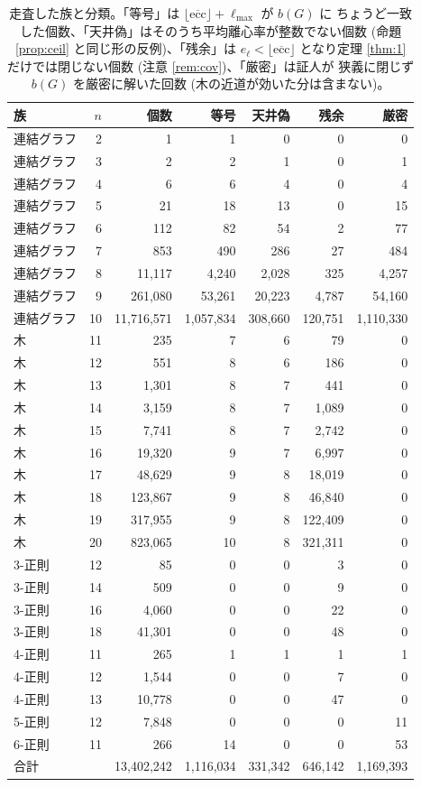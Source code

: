 \documentclass[paper=a4,fontsize=10.5pt,jafontsize=10.5pt]{jlreq}
\theoremstyle{plain}
\theoremstyle{definition}
\begin{document}
\begin{table}[htbp]
\centering
\small
\caption{走査した族と分類。「等号」は
$\lfloor \overline{\mathrm{ecc}} \rfloor + \ell_{\max}$ が $b(G)$ に
ちょうど一致した個数、「天井偽」はそのうち平均離心率が整数でない個数
(命題 \ref{prop:ceil} と同じ形の反例)、「残余」は
$e_{\ell} < \lfloor \overline{\mathrm{ecc}} \rfloor$ となり定理
\ref{thm:1} だけでは閉じない個数 (注意 \ref{rem:cov})、「厳密」は証人が
狭義に閉じず $b(G)$ を厳密に解いた回数 (木の近道が効いた分は含まない)。}
\label{tab:fams}
\begin{tabular}{lrrrrrr}
\toprule
族 & $n$ & 個数 & 等号 & 天井偽 & 残余 & 厳密 \\
\midrule
連結グラフ & 2 & 1 & 1 & 0 & 0 & 0 \\
連結グラフ & 3 & 2 & 2 & 1 & 0 & 1 \\
連結グラフ & 4 & 6 & 6 & 4 & 0 & 4 \\
連結グラフ & 5 & 21 & 18 & 13 & 0 & 15 \\
連結グラフ & 6 & 112 & 82 & 54 & 2 & 77 \\
連結グラフ & 7 & 853 & 490 & 286 & 27 & 484 \\
連結グラフ & 8 & 11,117 & 4,240 & 2,028 & 325 & 4,257 \\
連結グラフ & 9 & 261,080 & 53,261 & 20,223 & 4,787 & 54,160 \\
連結グラフ & 10 & 11,716,571 & 1,057,834 & 308,660 & 120,751 & 1,110,330 \\
木 & 11 & 235 & 7 & 6 & 79 & 0 \\
木 & 12 & 551 & 8 & 6 & 186 & 0 \\
木 & 13 & 1,301 & 8 & 7 & 441 & 0 \\
木 & 14 & 3,159 & 8 & 7 & 1,089 & 0 \\
木 & 15 & 7,741 & 8 & 7 & 2,742 & 0 \\
木 & 16 & 19,320 & 9 & 7 & 6,997 & 0 \\
木 & 17 & 48,629 & 9 & 8 & 18,019 & 0 \\
木 & 18 & 123,867 & 9 & 8 & 46,840 & 0 \\
木 & 19 & 317,955 & 9 & 8 & 122,409 & 0 \\
木 & 20 & 823,065 & 10 & 8 & 321,311 & 0 \\
3-正則 & 12 & 85 & 0 & 0 & 3 & 0 \\
3-正則 & 14 & 509 & 0 & 0 & 9 & 0 \\
3-正則 & 16 & 4,060 & 0 & 0 & 22 & 0 \\
3-正則 & 18 & 41,301 & 0 & 0 & 48 & 0 \\
4-正則 & 11 & 265 & 1 & 1 & 1 & 1 \\
4-正則 & 12 & 1,544 & 0 & 0 & 7 & 0 \\
4-正則 & 13 & 10,778 & 0 & 0 & 47 & 0 \\
5-正則 & 12 & 7,848 & 0 & 0 & 0 & 11 \\
6-正則 & 11 & 266 & 14 & 0 & 0 & 53 \\
\midrule
\multicolumn{2}{l}{合計} & 13,402,242 & 1,116,034 & 331,342
& 646,142 & 1,169,393 \\
\bottomrule
\end{tabular}
\end{table}
\end{document}
